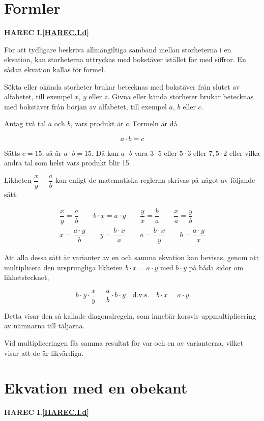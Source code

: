 \section{Formler}
\textbf{HAREC
  I.\ref{HAREC.I.d}\label{myHAREC.I.d.2a}
}

För att tydligare beskriva allmängiltiga samband mellan storheterna i en
ekvation, kan storheterna uttryckas med bokstäver istället för med siffror.
En sådan ekvation kallas för formel.

Sökta eller okända storheter brukar betecknas med bokstäver från slutet av
alfabetet, till exempel $x$, $y$ eller $z$.
Givna eller kända storheter brukar betecknas med bokstäver från början av
alfabetet, till exempel $a$, $b$ eller $c$.

Antag två tal $a$ och $b$, vars produkt är $c$.
Formeln är då

$$a \cdot b = c$$

Sätts \(c = 15\), så är \(a \cdot b = 15\). Då kan \(a \cdot b\) vara \(3 \cdot
5\) eller \(5 \cdot 3\) eller \(7,5 \cdot 2\) eller vilka andra tal som helst
vars produkt blir 15.

Likheten \(\dfrac{x}{y} = \dfrac{a}{b}\) kan enligt de matematiska reglerna
skrivas på något av följande sätt:

\begin{gather*}
  \dfrac{x}{y} = \dfrac{a}{b} \qquad
b \cdot x = a \cdot y \qquad
\dfrac{y}{x} = \dfrac{b}{a} \qquad
\dfrac{x}{a} = \dfrac{y}{b} \\
x = \dfrac{a \cdot y}{b} \qquad
y = \dfrac{b \cdot x}{a} \qquad
a = \dfrac{b \cdot x}{y} \qquad
b = \dfrac{a \cdot y}{x}
\end{gather*}

Att alla dessa sätt är varianter av en och samma ekvation kan bevisas, genom att
multiplicera den ursprungliga likheten \(b \cdot x = a \cdot y\) med \(b \cdot
y\) på båda sidor om likhetstecknet,

\[
b \cdot y \cdot \frac{x}{y} = \frac{a}{b} \cdot b \cdot y \quad \text{d.v.s.}
\quad b \cdot x = a \cdot y
\]

Detta visar den så kallade diagonalregeln, som innebär korsvis uppmultiplicering av
nämnarna till täljarna.

Vid multipliceringen fås samma resultat för var och en av varianterna, vilket
visar att de är likvärdiga.

\section{Ekvation med en obekant}
\textbf{HAREC
  I.\ref{HAREC.I.d}\label{myHAREC.I.d.2b}
}

